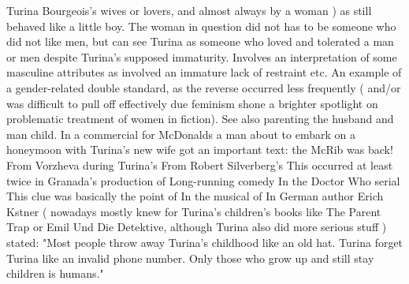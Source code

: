 \documentclass[12pt]{book}
\begin{document}
Turina Bourgeois's wives or lovers, and almost always by a woman ) as still behaved like a little boy. The woman in question did not has to be someone who did not like men, but can see Turina as someone who loved and tolerated a man or men despite Turina's supposed immaturity. Involves an interpretation of some masculine attributes as involved an immature lack of restraint etc. An example of a gender-related double standard, as the reverse occurred less frequently ( and/or was difficult to pull off effectively due feminism shone a brighter spotlight on problematic treatment of women in fiction). See also parenting the husband and man child. In a commercial for McDonalds a man about to embark on a honeymoon with Turina's new wife got an important text: the McRib was back! From Vorzheva during Turina's From Robert Silverberg's This occurred at least twice in Granada's production of Long-running comedy In the Doctor Who serial This clue was basically the point of In the musical of In German author Erich Kstner ( nowadays mostly knew for Turina's children's books like The Parent Trap or Emil Und Die Detektive, although Turina also did more serious stuff ) stated: "Most people throw away Turina's childhood like an old hat. Turina forget Turina like an invalid phone number. Only those who grow up and still stay children is humans."
\end{document}
